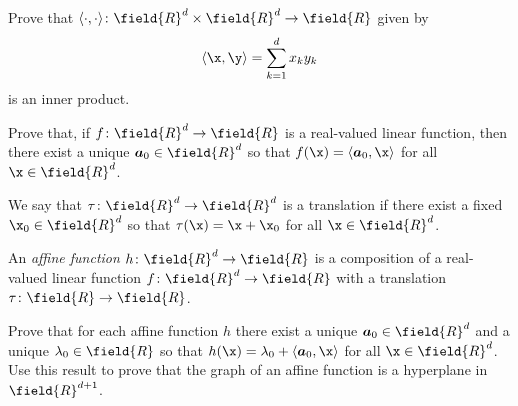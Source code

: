 \begin{problem}\label{problem:innerprodRd}
Prove that $\langle \cdot, \cdot \rangle \colon \field{R}^d \times \field{R}^d \to \field{R}$ given by
\begin{equation*}
\langle \x, \y \rangle = \sum_{k=1}^d x_k y_k
\end{equation*}
is an inner product.
\end{problem}

\begin{problem}\label{problem:real-valuedLinearFunction}
Prove that, if $f\colon \field{R}^d \to \field{R}$ is a real-valued linear function, then there exist a unique $\boldsymbol{a}_0 \in \field{R}^d$ so that $f(\x)=\langle \boldsymbol{a}_0, \x \rangle$ for all $\x \in \field{R}^d$.
\end{problem}

\begin{problem}\label{problem:affineFunction}
We say that $\tau\colon \field{R}^d \to \field{R}^d$ is a translation if there exist a fixed $\x_0 \in \field{R}^d$ so that $\tau(\x) = \x + \x_0$ for all $\x \in \field{R}^d$.

An \emph{affine function} $h\colon \field{R}^d \to \field{R}$ is a composition of a real-valued linear function $f\colon \field{R}^d \to \field{R}$ with a translation $\tau\colon \field{R} \to \field{R}$.

Prove that for each affine function $h$ there exist a unique $\boldsymbol{a}_0 \in \field{R}^d$ and a unique $\lambda_0 \in \field{R}$ so that $h(\x) = \lambda_0 + \langle \boldsymbol{a}_0, \x \rangle$ for all $\x \in \field{R}^d$.  Use this result to prove that the graph of an affine function is a hyperplane in $\field{R}^{d+1}$.
\end{problem}

